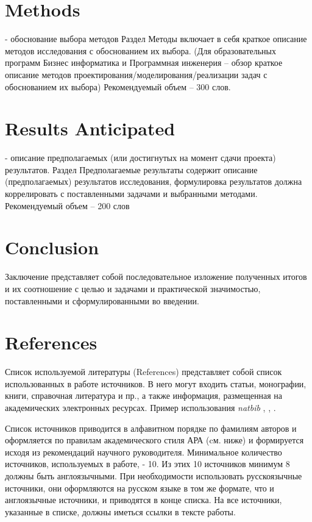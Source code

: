 \documentclass[PI]{ProjectProposal}
\begin{document}
\chapter*{Methods}
- обоснование выбора методов
Раздел Методы включает в себя краткое описание методов исследования с обоснованием их выбора. (Для образовательных программ Бизнес информатика и Программная инженерия – обзор краткое описание методов проектирования/моделирования/реализации задач с обоснованием их выбора) Рекомендуемый объем – 300 слов.


\chapter*{Results Anticipated}
- описание предполагаемых (или достигнутых на момент сдачи проекта) результатов.
Раздел Предполагаемые результаты содержит описание (предполагаемых) результатов исследования, формулировка результатов должна коррелировать с поставленными задачами и выбранными методами. Рекомендуемый объем – 200 слов

\chapter*{Conclusion}
Заключение представляет собой последовательное изложение полученных итогов и их соотношение с целью и задачами и практической значимостью, поставленными и сформулированными во введении.

\chapter*{References}
Список используемой литературы (References) представляет собой список использованных в работе источников. В него могут входить статьи, монографии, книги, справочная литература и пр., а также информация, размещенная на академических электронных ресурсах. Пример использования \textit{natbib} \citet{ArticleExample}, \citep{ArticleExample}, \citet*{ArticleExample}.



Список источников приводится в алфавитном порядке по фамилиям авторов и оформляется по правилам академического стиля АРА (cм. ниже) и формируется исходя из рекомендаций научного руководителя. Минимальное количество источников, используемых в работе, - 10. Из этих 10 источников минимум 8 должны быть англоязычными. При необходимости использовать русскоязычные источники, они оформляются на русском языке в том же формате, что и англоязычные источники, и приводятся в конце списка. На все источники, указанные в списке, должны иметься ссылки в тексте работы.
\end{document}
